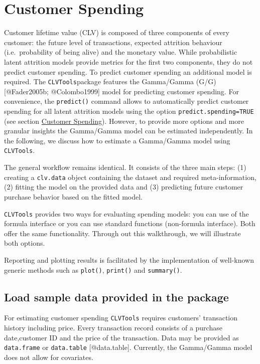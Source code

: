 \documentclass[
]{article}
\begin{document}
\section{Customer Spending}\label{spending}

Customer lifetime value (CLV) is composed of three components of every
customer: the future level of transactions, expected attrition behaviour
(i.e.~probability of being alive) and the monetary value. While
probabilistic latent attrition models provide metrics for the first two
components, they do not predict customer spending. To predict customer
spending an additional model is required. The \texttt{CLVTools}package
features the Gamma/Gamma (G/G) {[}@Fader2005b; @Colombo1999{]} model for
predicting customer spending. For convenience, the \texttt{predict()}
command allows to automatically predict customer spending for all latent
attrition models using the option \texttt{predict.spending=TRUE} (see
section \hyperref[spending]{Customer Spending}). However, to provide
more options and more granular insights the Gamma/Gamma model can be
estimated independently. In the following, we discuss how to estimate a
Gamma/Gamma model using \texttt{CLVTools}.

The general workflow remains identical. It consists of the three main
steps: (1) creating a \texttt{clv.data} object containing the dataset
and required meta-information, (2) fitting the model on the provided
data and (3) predicting future customer purchase behavior based on the
fitted model.

\texttt{CLVTools} provides two ways for evaluating spending models: you
can use of the formula interface or you can use standard functions
(non-formula interface). Both offer the same functionality. Through out
this walkthrough, we will illustrate both options.

Reporting and plotting results is facilitated by the implementation of
well-known generic methods such as \texttt{plot()}, \texttt{print()} and
\texttt{summary()}.

\subsection{Load sample data provided in the
package}\label{load-sample-data-provided-in-the-package-1}

For estimating customer spending \texttt{CLVTools} requires customers'
transaction history including price. Every transaction record consists
of a purchase date,customer ID and the price of the transaction. Data
may be provided as \texttt{data.frame} or \texttt{data.table}
{[}@data.table{]}. Currently, the Gamma/Gamma model does not allow for
covariates.
\end{document}
